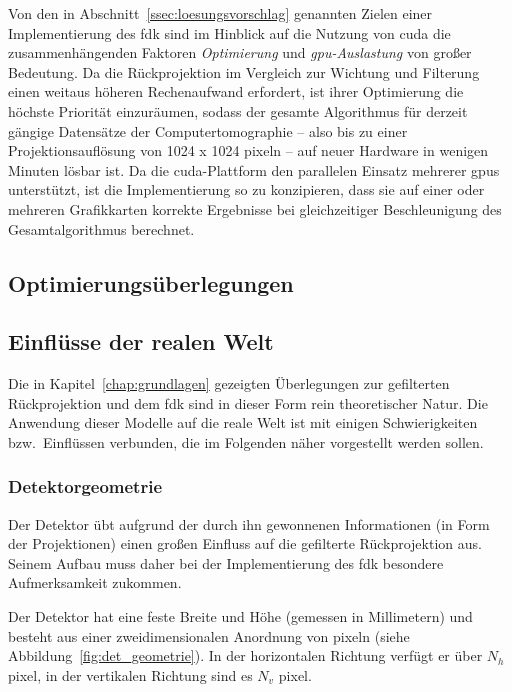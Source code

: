 Von den in Abschnitt~\ref{ssec:loesungsvorschlag} genannten Zielen einer Implementierung des \gls{fdk} sind im Hinblick
auf die Nutzung von \gls{cuda} die zusammenhängenden Faktoren \textit{Optimierung} und \textit{\gls{gpu}-Auslastung}
von großer Bedeutung. Da die Rückprojektion im Vergleich zur Wichtung und Filterung einen weitaus höheren Rechenaufwand
erfordert, ist ihrer Optimierung die höchste Priorität einzuräumen, sodass der gesamte Algorithmus für derzeit gängige
Datensätze der Computertomographie -- also bis zu einer Projektionsauflösung von 1024 x 1024 \gls{pixel}n -- auf neuer
Hardware in wenigen Minuten lösbar ist. Da die \gls{cuda}-Plattform den parallelen Einsatz mehrerer \gls{gpu}s
unterstützt, ist die Implementierung so zu konzipieren, dass sie auf einer oder mehreren Grafikkarten korrekte
Ergebnisse bei gleichzeitiger Beschleunigung des Gesamtalgorithmus berechnet.

\subsection{Optimierungsüberlegungen}

\subsection{Einflüsse der realen Welt}

Die in Kapitel~\ref{chap:grundlagen} gezeigten Überlegungen zur gefilterten Rückprojektion und dem \gls{fdk} sind in
dieser Form rein theoretischer Natur. Die Anwendung dieser Modelle auf die reale Welt ist mit einigen Schwierigkeiten
bzw.\ Einflüssen verbunden, die im Folgenden näher vorgestellt werden sollen.

\subsubsection{Detektorgeometrie}

Der Detektor übt aufgrund der durch ihn gewonnenen Informationen (in Form der Projektionen) einen großen Einfluss auf
die gefilterte Rückprojektion aus. Seinem Aufbau muss daher bei der Implementierung des \gls{fdk} besondere
Aufmerksamkeit zukommen.

Der Detektor hat eine feste Breite und Höhe (gemessen in Millimetern) und besteht aus einer zweidimensionalen Anordnung
von \gls{pixel}n (siehe Abbildung~\ref{fig:det_geometrie}). In der horizontalen Richtung verfügt er über $N_h$
\gls{pixel}, in der vertikalen Richtung sind es $N_v$ \gls{pixel}.

